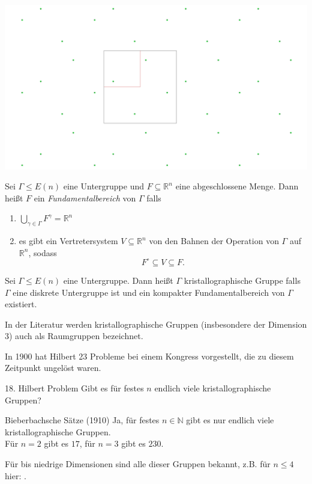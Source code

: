 \documentclass{beamer}
\theoremstyle{plain}
\newcommand\R{\mathbb R}
\newcommand\N{\mathbb N}
\begin{document}
\begin{frame}
    \centering
    \includegraphics[width=\textwidth]{images/p4-escher.png}
\end{frame}

\begin{frame}
    \begin{definition}
        Sei $\Gamma \leq E(n)$ eine Untergruppe und $F \subseteq \R^n$ eine abgeschlossene Menge. Dann heißt $F$ ein \emph{Fundamentalbereich} von $\Gamma$ falls
        \begin{enumerate}[label=(\roman*)]
            \item $\bigcup_{\gamma \in \Gamma} F^\gamma = \R^n$\pause
            \item es gibt ein Vertretersystem $V \subseteq \R^n$ von den Bahnen der Operation von $\Gamma$ auf $\R^n$, sodass
                $$
                    F^\circ \subseteq V \subseteq F.
                $$
        \end{enumerate}
    \end{definition}

    \pause
    \begin{definition}
        Sei $\Gamma \leq E(n)$ eine Untergruppe. Dann heißt $\Gamma$ kristallographische Gruppe falls $\Gamma$ eine diskrete Untergruppe ist und ein kompakter Fundamentalbereich von $\Gamma$ existiert.
    \end{definition}
    In der Literatur werden kristallographische Gruppen (insbesondere der Dimension $3$) auch als Raumgruppen bezeichnet.
\end{frame}

\begin{frame}
    In 1900 hat Hilbert 23 Probleme bei einem Kongress vorgestellt, die zu diesem Zeitpunkt ungelöst waren.
    \begin{block}{18. Hilbert Problem}
        Gibt es für festes $n$ endlich viele kristallographische Gruppen?
    \end{block}
    \pause
    \begin{exampleblock}{Bieberbachsche Sätze (1910)}
        Ja, für festes $n \in \N$ gibt es nur endlich viele kristallographische Gruppen. \\
        Für $n=2$ gibt es $17$, für $n=3$ gibt es $230$.
    \end{exampleblock}
    Für bis niedrige Dimensionen sind alle dieser Gruppen bekannt, z.B. für $n\leq 4$ hier: \cite{crystGrpsDimFour}.
\end{frame}
\end{document}
